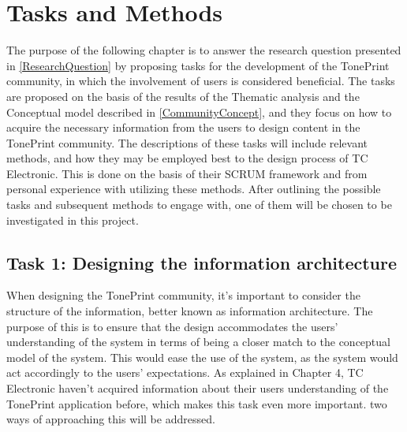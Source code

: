 \chapter{Tasks and Methods}
\label{TaskAndMethods}
The purpose of the following chapter is to answer the research question presented in \autoref{ResearchQuestion} by proposing tasks for the development of the TonePrint community, in which the involvement of users is considered beneficial. The tasks are proposed on the basis of the results of the Thematic analysis and the Conceptual model described in \autoref{CommunityConcept}, and they focus on how to acquire the necessary information from the users to design content in the TonePrint community. The descriptions of these tasks will include relevant methods, and how they may be employed best to the design process of TC Electronic. This is done on the basis of their SCRUM framework and from personal experience with utilizing these methods. After outlining the possible tasks and subsequent methods to engage with, one of them will be chosen to be investigated in this project.


\section{Task 1: Designing the information architecture}
\label{Task1}
When designing the TonePrint community, it's important to consider the structure of the information, better known as information architecture. The purpose of this is to ensure that the design accommodates the users' understanding of the system in terms of being a closer match to the conceptual model of the system. This would ease the use of the system, as the system would act accordingly to the users' expectations. As explained in Chapter 4, TC Electronic haven't acquired information about their users understanding of the TonePrint application before, which makes this task even more important. two ways of approaching this will be addressed. \\

